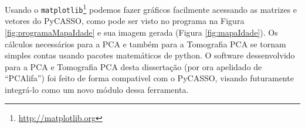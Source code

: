 Usando o \texttt{matplotlib}\footnote{\url{http://matplotlib.org}} podemos fazer gráficos facilmente acessando as
matrizes e vetores do PyCASSO, como pode ser visto no programa na Figura \ref{fig:programaMapaIdade} e sua imagem gerada
(Figura \ref{fig:mapaIdade}). Os cálculos necessários para a PCA e também para a Tomografia PCA se tornam simples contas
usando pacotes matemáticos de python. O software dessenvolvido para a PCA e Tomografia PCA desta dissertação (por ora
apelidado de ``PCAlifa'') foi feito de forma compativel com o PyCASSO, visando futuramente integrá-lo como um novo
módulo dessa ferramenta.

